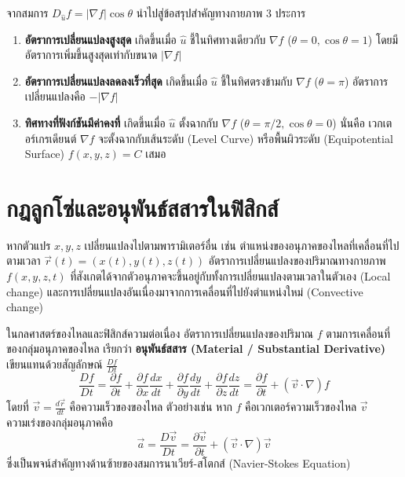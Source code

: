 จากสมการ $D_{\hat{u}}f = |\nabla f|\cos\theta$ นำไปสู่ข้อสรุปสำคัญทางกายภาพ 3 ประการ
\begin{enumerate}
    \item \textbf{อัตราการเปลี่ยนแปลงสูงสุด} เกิดขึ้นเมื่อ $\hat{u}$ ชี้ในทิศทางเดียวกับ $\nabla f$ ($\theta = 0, \cos\theta = 1$) โดยมีอัตราการเพิ่มขึ้นสูงสุดเท่ากับขนาด $|\nabla f|$
    \item \textbf{อัตราการเปลี่ยนแปลงลดลงเร็วที่สุด} เกิดขึ้นเมื่อ $\hat{u}$ ชี้ในทิศตรงข้ามกับ $\nabla f$ ($\theta = \pi$) อัตราการเปลี่ยนแปลงคือ $-|\nabla f|$
    \item \textbf{ทิศทางที่ฟังก์ชันมีค่าคงที่} เกิดขึ้นเมื่อ $\hat{u}$ ตั้งฉากกับ $\nabla f$ ($\theta = \pi/2, \cos\theta = 0$) นั่นคือ เวกเตอร์เกรเดียนต์ $\nabla f$ จะตั้งฉากกับเส้นระดับ (Level Curve) หรือพื้นผิวระดับ (Equipotential Surface) $f(x, y, z) = C$ เสมอ
\end{enumerate}

\section{กฎลูกโซ่และอนุพันธ์สสารในฟิสิกส์}
หากตัวแปร $x, y, z$ เปลี่ยนแปลงไปตามพารามิเตอร์อื่น เช่น ตำแหน่งของอนุภาคของไหลที่เคลื่อนที่ไปตามเวลา $\vec{r}(t) = (x(t), y(t), z(t))$ อัตราการเปลี่ยนแปลงของปริมาณทางกายภาพ $f(x, y, z, t)$ ที่สังเกตได้จากตัวอนุภาคจะขึ้นอยู่กับทั้งการเปลี่ยนแปลงตามเวลาในตัวเอง (Local change) และการเปลี่ยนแปลงอันเนื่องมาจากการเคลื่อนที่ไปยังตำแหน่งใหม่ (Convective change)

\begin{maththeorem}
ในกลศาสตร์ของไหลและฟิสิกส์ความต่อเนื่อง อัตราการเปลี่ยนแปลงของปริมาณ $f$ ตามการเคลื่อนที่ของกลุ่มอนุภาคของไหล เรียกว่า \textbf{อนุพันธ์สสาร (Material / Substantial Derivative)} เขียนแทนด้วยสัญลักษณ์ $\frac{Df}{Dt}$
\begin{equation}
\frac{Df}{Dt} = \frac{\partial f}{\partial t} + \frac{\partial f}{\partial x}\frac{dx}{dt} + \frac{\partial f}{\partial y}\frac{dy}{dt} + \frac{\partial f}{\partial z}\frac{dz}{dt} = \frac{\partial f}{\partial t} + (\vec{v} \cdot \nabla)f
\end{equation}
โดยที่ $\vec{v} = \frac{d\vec{r}}{dt}$ คือความเร็วของของไหล ตัวอย่างเช่น หาก $f$ คือเวกเตอร์ความเร็วของไหล $\vec{v}$ ความเร่งของกลุ่มอนุภาคคือ
\begin{equation}
\vec{a} = \frac{D\vec{v}}{Dt} = \frac{\partial \vec{v}}{\partial t} + (\vec{v} \cdot \nabla)\vec{v}
\end{equation}
ซึ่งเป็นพจน์สำคัญทางด้านซ้ายของสมการนาเวียร์-สโตกส์ (Navier-Stokes Equation)
\end{maththeorem}

